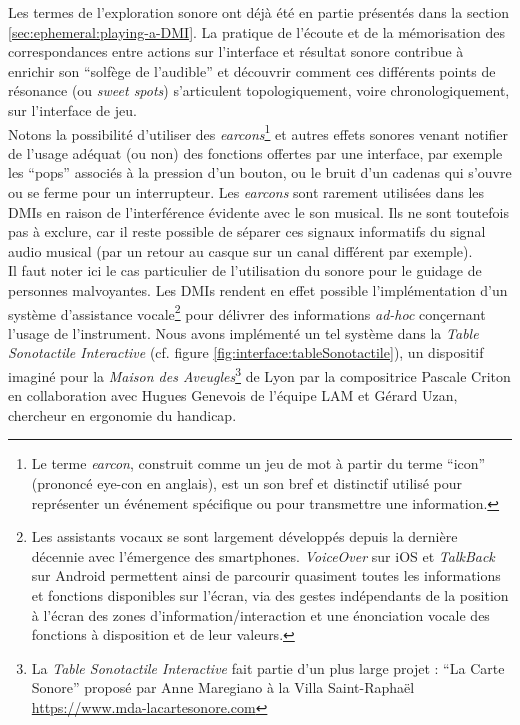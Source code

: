 \noindent Les termes de l'exploration sonore ont déjà été en partie présentés dans la section \ref{sec:ephemeral:playing-a-DMI}. La pratique de l'écoute et de la mémorisation des correspondances entre actions sur l'interface et résultat sonore contribue à enrichir son ``solfège de l'audible'' \cite{savouret_introduction_2010} et découvrir comment ces différents points de résonance (ou \textit{sweet spots}) s'articulent topologiquement, voire chronologiquement, sur l'interface de jeu.\\
\indent Notons la possibilité d'utiliser des \textit{earcons}\footnote{Le terme \textit{earcon}, construit comme un jeu de mot à partir du terme ``icon'' (prononcé eye-con en anglais), est un son bref et distinctif utilisé pour représenter un événement spécifique ou pour transmettre une information.} et autres effets sonores venant notifier de l'usage adéquat (ou non) des fonctions offertes par une interface, par exemple les ``pops'' associés à la pression d'un bouton, ou le bruit d'un cadenas qui s'ouvre ou se ferme pour un interrupteur. Les \textit{earcons} sont rarement utilisées dans les \glspl{DMI} en raison de l'interférence évidente avec le son musical. Ils ne sont toutefois pas à exclure, car il reste possible de séparer ces signaux informatifs du signal audio musical (par un retour au casque sur un canal différent par exemple).\\
\indent Il faut noter ici le cas particulier de l'utilisation du sonore pour le guidage de personnes malvoyantes. Les \glspl{DMI} rendent en effet possible l'implémentation d'un système d'assistance vocale\footnote{Les assistants vocaux se sont largement développés depuis la dernière décennie avec l'émergence des smartphones. \textit{VoiceOver} sur iOS et \textit{TalkBack} sur Android permettent ainsi de parcourir quasiment toutes les informations et fonctions disponibles sur l'écran, via des gestes indépendants de la position à l'écran des zones d'information/interaction et une énonciation vocale des fonctions à disposition et de leur valeurs.} pour délivrer des informations \textit{ad-hoc} conçernant l'usage de l'instrument. Nous avons implémenté un tel système dans la \textit{Table Sonotactile Interactive} (cf. figure \ref{fig:interface:tableSonotactile}), un dispositif imaginé pour la \textit{Maison des Aveugles}\footnote{La \textit{Table Sonotactile Interactive} fait partie d'un plus large projet : ``La Carte Sonore'' proposé par Anne Maregiano à la Villa Saint-Raphaël \url{https://www.mda-lacartesonore.com}} de Lyon par la compositrice Pascale Criton en collaboration avec Hugues Genevois de l'équipe \gls{LAM} et Gérard Uzan, chercheur en ergonomie du handicap.

